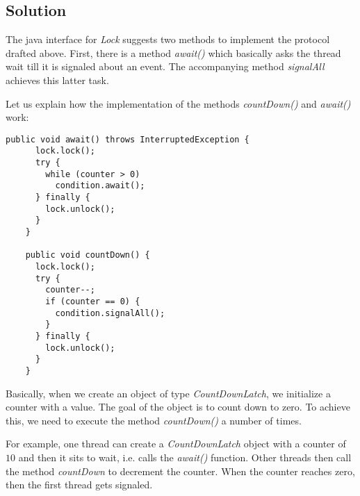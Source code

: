 \subsection{Solution}
\par
The java interface for \textit{Lock} suggests two methods to implement the
protocol drafted above. First, there is a method \textit{await()} which
basically asks the thread wait till it is signaled about an event. The
accompanying method \textit{signalAll} achieves this latter task.
\par
Let us explain how the implementation of the methods \textit{countDown()} and
\textit{await()} work:
\par
\hfill
\begin{lstlisting}[style=numbers]
    public void await() throws InterruptedException {
      lock.lock(); 
      try {
        while (counter > 0)
          condition.await();
      } finally {
        lock.unlock();
      }
    } 
      
    public void countDown() {
      lock.lock();
      try {
        counter--;
        if (counter == 0) {
          condition.signalAll();
        }
      } finally {
        lock.unlock();
      }
    }   
\end{lstlisting}
\hfill
\par
Basically, when we create an object of type \textit{CountDownLatch}, we
initialize a counter with a value. The goal of the object is to count down to
zero. To achieve this, we need to execute the method \textit{countDown()} a
number of times. 
\par
For example, one thread can create a \textit{CountDownLatch} object with a
counter of $10$ and then it sits to wait, i.e. calls the \textit{await()}
function. Other threads then call the method \textit{countDown} to decrement the
counter. When the counter reaches zero, then the first thread gets signaled.
\par
